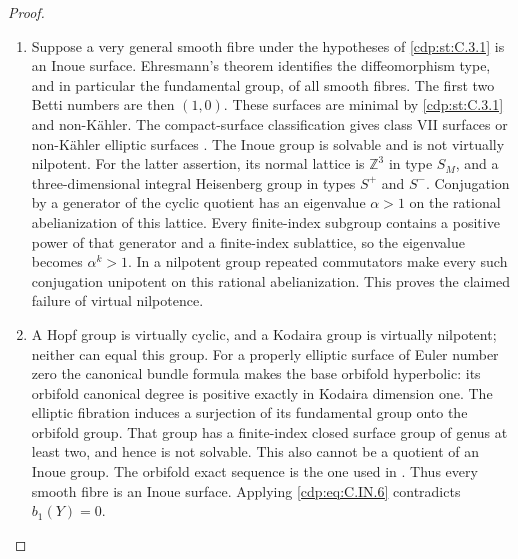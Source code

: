 \begin{proof}
\begin{enumerate}[leftmargin=*]
\item Suppose a very general smooth fibre under the hypotheses of
\ref{cdp:st:C.3.1} is an Inoue surface. Ehresmann's
theorem identifies the diffeomorphism type, and in particular
the fundamental group, of all smooth fibres. The first two
Betti numbers are then $(1,0)$. These surfaces are minimal by
\ref{cdp:st:C.3.1} and non-K\"ahler. The compact-surface classification
gives class VII surfaces or non-K\"ahler elliptic surfaces
\cite[Theorem 3.2]{BMS2012}.
The Inoue group is solvable and is not virtually nilpotent.
For the latter assertion, its normal lattice is $\mathbb Z^3$
in type $S_M$, and a three-dimensional integral Heisenberg group
in types $S^{+}$ and $S^{-}$. Conjugation by a generator of the
cyclic quotient has an eigenvalue $\alpha>1$ on the rational
abelianization of this lattice. Every finite-index subgroup
contains a positive power of that generator and a finite-index
sublattice, so the eigenvalue becomes $\alpha^k>1$. In a
nilpotent group repeated commutators make every such conjugation
unipotent on this rational abelianization. This proves the
claimed failure of virtual nilpotence.

\item A Hopf group is virtually cyclic, and a Kodaira group is virtually
nilpotent; neither can equal this group. For a properly elliptic
surface of Euler number zero the canonical bundle formula makes
the base orbifold hyperbolic: its orbifold canonical degree is
positive exactly in Kodaira dimension one. The elliptic
fibration induces a surjection of its fundamental group onto the
orbifold group. That group has a finite-index closed surface
group of genus at least two, and hence is not solvable. This
also cannot be a quotient of an Inoue group. The orbifold exact
sequence is the one used in \cite[Section 3.3]{BMS2012}.
Thus every smooth fibre is an Inoue surface. Applying \eqref{cdp:eq:C.IN.6}
contradicts $b_1(Y)=0$.

\end{enumerate}
\end{proof}